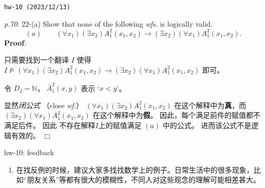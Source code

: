 \documentclass[UTF8,12pt,a4paper]{ctexart}
\begin{document}
\noindent\texttt{hw-10 (2023/12/13)}

\emph{p.70}: 22-(a) \quad
Show that none of the following \textit{wfs.} is logically valid.
\[
(a) \qquad 
(\forall x_1) (\exists x_2) A^2_1(x_1,x_2) \to (\exists x_2) (\forall x_1) A^2_1 (x_1,x_2).
\]
\textbf{Proof}:   

只需要找到一个翻译 $I$ 使得 $I \not \models (\forall x_1) (\exists x_2) A^2_1(x_1,x_2) \to (\exists x_2) (\forall x_1) A^2_1 (x_1,x_2)$ 即可。

令 $D_I=\mathbb{N}$， $\bar{A}^2_1(x,y)$ 表示 `$x < y$'。


显然\textit{闭公式}  （close \textit{wf.}） $(\forall x_1) (\exists x_2) A^2_1(x_1,x_2)$ 在这个解释中为\textbf{真}，而 
$(\exists x_2) (\forall x_1) A^2_1 (x_1,x_2)$ 在这个解释中为\textbf{假}。
因此，每个满足前件的赋值都不满足后件。
因此 不存在解释$I$上的赋值满足 $(a)$ 中的公式。
进而该公式不是逻辑有效的。 
\hfill $\Box$


\vspace{1em}
\dotfill hw-10: feedback
\dotfill

\begin{enumerate}
	\item 在找反例的时候，建议大家多找找数学上的例子。日常生活中的很多现象，比如“朋友关系”等都有很大的模糊性，不同人对这些观念的理解可能相差甚大。
\end{enumerate}




\end{document}
